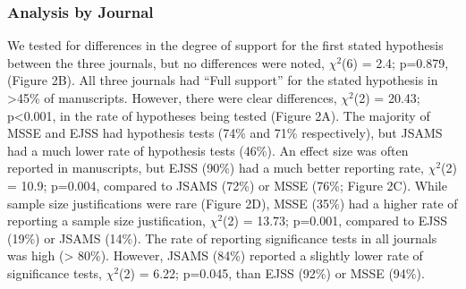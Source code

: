 \documentclass[]{cik}%
\begin{document}
\hypertarget{analysis-by-journal}{%
\subsubsection{Analysis by Journal}\label{analysis-by-journal}}

We tested for differences in the degree of support for the first stated
hypothesis between the three journals, but no differences were noted,
\(\chi^2\)(6) = 2.4; p=0.879, (Figure 2B). All three journals had ``Full
support'' for the stated hypothesis in \textgreater45\% of manuscripts.
However, there were clear differences, \(\chi^2\)(2) = 20.43;
p\textless0.001, in the rate of hypotheses being tested (Figure 2A). The
majority of MSSE and EJSS had hypothesis tests (74\% and 71\%
respectively), but JSAMS had a much lower rate of hypothesis tests
(46\%). An effect size was often reported in manuscripts, but EJSS
(90\%) had a much better reporting rate, \(\chi^2\)(2) = 10.9; p=0.004,
compared to JSAMS (72\%) or MSSE (76\%; Figure 2C). While sample size
justifications were rare (Figure 2D), MSSE (35\%) had a higher rate of
reporting a sample size justification, \(\chi^2\)(2) = 13.73; p=0.001,
compared to EJSS (19\%) or JSAMS (14\%). The rate of reporting
significance tests in all journals was high (\textgreater{} 80\%).
However, JSAMS (84\%) reported a slightly lower rate of significance
tests, \(\chi^2\)(2) = 6.22; p=0.045, than EJSS (92\%) or MSSE (94\%).

\newpage
\end{document}
